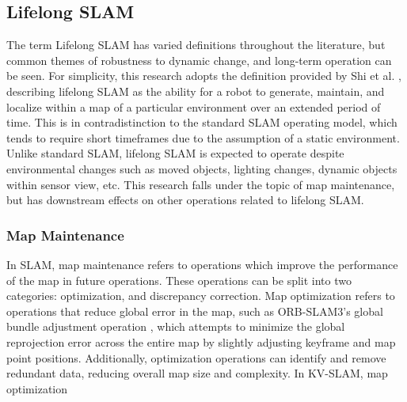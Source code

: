 \subsection{Lifelong SLAM}

The term Lifelong SLAM has varied definitions throughout the literature, but common themes of robustness to dynamic change, and long-term operation can be seen. For simplicity, this research adopts the definition provided by Shi et al. \cite{shiAreWeReady2020}, describing lifelong SLAM as the ability for a robot to generate, maintain, and localize within a map of a particular environment over an extended period of time. This is in contradistinction to the standard SLAM operating model, which tends to require short timeframes due to the assumption of a static environment. Unlike standard SLAM, lifelong SLAM is expected to operate despite environmental changes such as moved objects, lighting changes, dynamic objects within sensor view, etc. This research falls under the topic of map maintenance, but has downstream effects on other operations related to lifelong SLAM.

\subsubsection{Map Maintenance}

In SLAM, map maintenance refers to operations which improve the performance of the map in future operations. These operations can be split into two categories: optimization, and discrepancy correction. Map optimization refers to operations that reduce global error in the map, such as ORB-SLAM3's global bundle adjustment operation \cite{camposORBSLAM3AccurateOpenSource2021}, which attempts to minimize the global reprojection error across the entire map by slightly adjusting keyframe and map point positions. Additionally, optimization operations can identify and remove redundant data, reducing overall map size and complexity. In KV-SLAM, map optimization